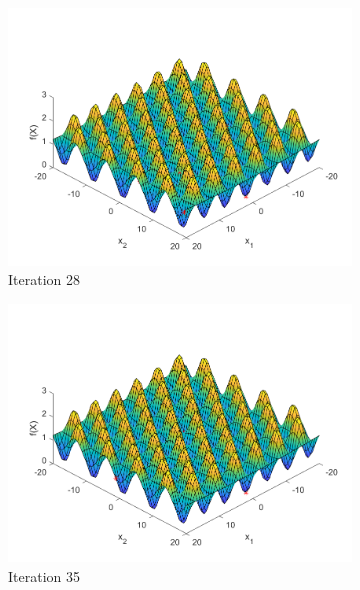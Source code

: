 \begin{figure}
\begin{subfigure}[b]{0.4\textwidth}
   \includegraphics[width=\textwidth]{img/smpl/grwnk2d/loa-iter-28}
   \caption{Iteration 28}
   \label{fig:s3-iter-4}
 \end{subfigure}
 \begin{subfigure}[b]{0.4\textwidth}
   \includegraphics[width=\textwidth]{img/smpl/grwnk2d/loa-iter-35}
   \caption{Iteration 35}
   \label{fig:s3-iter-5}
 \end{subfigure}
 \begin{subfigure}[b]{0.4\textwidth}

\end{subfigure}
\end{figure}
